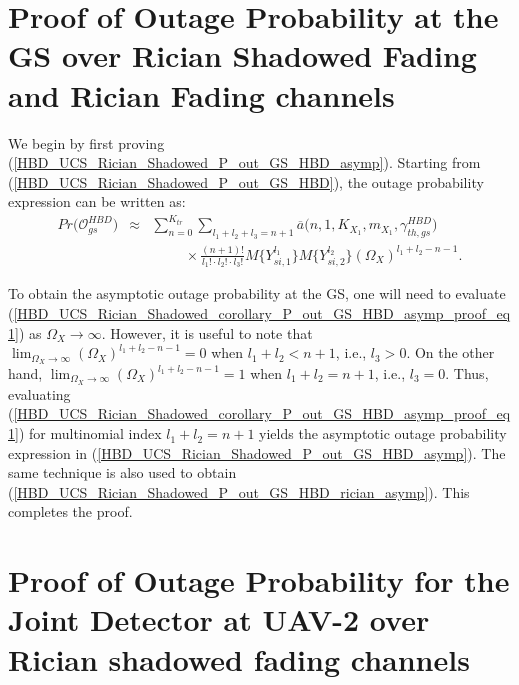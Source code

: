 \section{Proof of Outage Probability at the GS over Rician Shadowed Fading and Rician Fading channels} \label{HBD_UCS_Rician_Shadowed_corollary_P_out_GS_HBD_asymp_proof}
We begin by first proving (\ref{HBD_UCS_Rician_Shadowed_P_out_GS_HBD_asymp}). Starting from (\ref{HBD_UCS_Rician_Shadowed_P_out_GS_HBD}), the outage probability expression can be written as:
\begin{eqnarray} \label{HBD_UCS_Rician_Shadowed_corollary_P_out_GS_HBD_asymp_proof_eq1}
Pr\big(\mathcal{O}_{gs}^{HBD}\big) & \approx & \sum_{n=0}^{K_{tr}} \sum_{l_1 + l_2 + l_3 = n+1} \overline{a}\big(n,1,K_{X_1},m_{X_1},\gamma_{th,gs}^{HBD}\big) \nonumber\\
 & & \hspace{1cm} \times \frac{(n+1)!}{l_1! \cdot l_2! \cdot l_3!} M\{Y_{si,1}^{l_1}\} M\{Y_{si,2}^{l_2}\} (\Omega_X)^{l_1 + l_2 - n - 1}.
\end{eqnarray}


To obtain the asymptotic outage probability at the GS, one will need to evaluate (\ref{HBD_UCS_Rician_Shadowed_corollary_P_out_GS_HBD_asymp_proof_eq1}) as $\Omega_X \to \infty$. However, it is useful to note that $\lim_{\Omega_X \to \infty} (\Omega_X)^{l_1 + l_2 - n - 1} = 0$ when $l_1 + l_2 < n+1$, i.e., $l_3 >0$. On the other hand, $\lim_{\Omega_X \to \infty} (\Omega_X)^{l_1 + l_2 - n - 1} = 1$ when $l_1 + l_2 = n+1$, i.e., $l_3 = 0$. Thus, evaluating (\ref{HBD_UCS_Rician_Shadowed_corollary_P_out_GS_HBD_asymp_proof_eq1}) for multinomial index $l_1 + l_2 = n+1$ yields the asymptotic outage probability expression in (\ref{HBD_UCS_Rician_Shadowed_P_out_GS_HBD_asymp}). The same technique is also used to obtain (\ref{HBD_UCS_Rician_Shadowed_P_out_GS_HBD_rician_asymp}). This completes the proof.

\section{Proof of Outage Probability for the Joint Detector at UAV-2 over Rician shadowed fading channels} \label{HBD_UCS_Rician_Shadowed_JD_proof}
